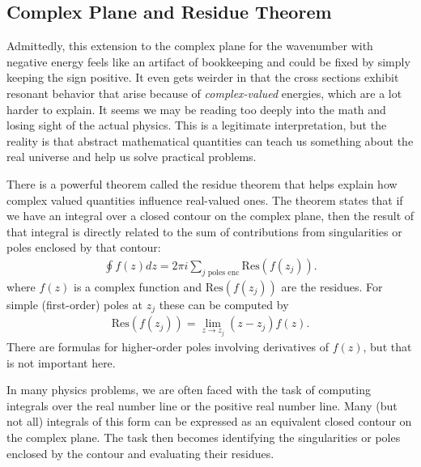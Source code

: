 

\subsection{Complex Plane and Residue Theorem}

Admittedly, this extension to the complex plane for the wavenumber with negative energy feels like an artifact of bookkeeping and could be fixed by simply keeping the sign positive. It even gets weirder in that the cross sections exhibit resonant behavior that arise because of \emph{complex-valued} energies, which are a lot harder to explain. It seems we may be reading too deeply into the math and losing sight of the actual physics. This is a legitimate interpretation, but the reality is that abstract mathematical quantities can teach us something about the real universe and help us solve practical problems.

There is a powerful theorem called the residue theorem that helps explain how complex valued quantities influence real-valued ones. The theorem states that if we have an integral over a closed contour on the complex plane, then the result of that integral is directly related to the sum of contributions from singularities or poles enclosed by that contour:
\begin{align}
  \oint f(z) dz = 2\pi i \sum_{j \text{ poles enc}} \text{Res}(f(z_j)) .
\end{align}
where $f(z)$ is a complex function and $\text{Res}(f(z_j))$ are the residues. For simple (first-order) poles at $z_j$ these can be computed by
\begin{align}
  \text{Res}(f(z_j)) = \lim_{z \rightarrow z_j} ( z - z_j ) f(z) .
\end{align}
There are formulas for higher-order poles involving derivatives of $f(z)$, but that is not important here.

In many physics problems, we are often faced with the task of computing integrals over the real number line or the positive real number line. Many (but not all) integrals of this form can be expressed as an equivalent closed contour on the complex plane. The task then becomes identifying the singularities or poles enclosed by the contour and evaluating their residues.


